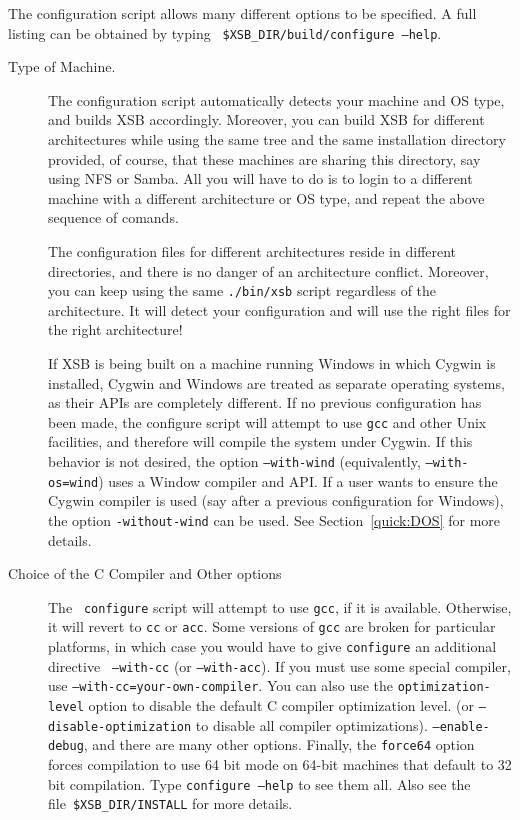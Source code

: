 The configuration script allows many different options to be
specified.  A full listing can be obtained by typing {\tt
\$XSB\_DIR/build/configure --help}.
\begin{description}
\item[Type of Machine.]  The configuration script automatically detects
  your machine and OS type, and builds XSB accordingly. Moreover, you can
  build XSB for different architectures while using the same tree and the
  same installation directory provided, of course, that these machines are
  sharing this directory, say using NFS or Samba. All you will have to do
  is to login to a different machine with a different architecture or OS
  type, and repeat the above sequence of comands.
  
  The configuration files for different architectures reside in different
  directories, and there is no danger of an architecture conflict.
  Moreover, you can keep using the same {\tt ./bin/xsb} script regardless
  of the architecture. It will detect your configuration and will use the
  right files for the right architecture! 

  If XSB is being built on a machine running Windows in which Cygwin
  is installed, Cygwin and Windows are treated as separate operating
  systems, as their APIs are completely different.  If no previous
  configuration has been made, the configure script will attempt to
  use {\tt gcc} and other Unix facilities, and therefore will compile
  the system under Cygwin.  If this behavior is not desired, the
  option {\tt --with-wind} (equivalently, {\tt --with-os=wind}) uses a
  Window compiler and API.  If a user wants to ensure the Cygwin
  compiler is used (say after a previous configuration for Windows),
  the option {\tt -without-wind} can be used.  See
  Section~\ref{quick:DOS} for more details.

    
\item[Choice of the C Compiler and Other options] \label{cc} The {\tt
  configure} script will attempt to use {\tt gcc}, if it is available.
  Otherwise, it will revert to {\tt cc} or {\tt acc}.  Some versions
  of {\tt gcc} are broken for particular platforms, in which case you
  would have to give {\tt configure} an additional directive {\tt
    --with-cc} (or {\tt --with-acc}).  If you must use some special
  compiler, use {\tt --with-cc=your-own-compiler}.  You can also use
  the {\tt optimization-level} option to disable the default C
  compiler optimization level.  (or {\tt --disable-optimization} to
  disable all compiler optimizations).  {\tt --enable-debug}, and
  there are many other options.  Finally, the {\tt force64} option
  forces compilation to use 64 bit mode on 64-bit machines that
  default to 32 bit compilation.  Type {\tt configure --help} to see
  them all. Also see the file~\verb'$XSB_DIR/INSTALL' for more
  details.


\end{description}
